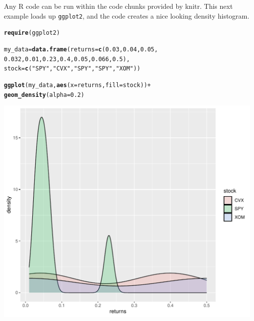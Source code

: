 \documentclass{article}\usepackage[]{graphicx}\usepackage[]{xcolor}
\makeatletter
\def\maxwidth{ %
  \ifdim\Gin@nat@width>\linewidth
    \linewidth
  \else
    \Gin@nat@width
  \fi
}
\newcommand{\hlnum}[1]{\textcolor[rgb]{0.686,0.059,0.569}{#1}}%
\newcommand{\hlstr}[1]{\textcolor[rgb]{0.192,0.494,0.8}{#1}}%
\newcommand{\hlopt}[1]{\textcolor[rgb]{0,0,0}{#1}}%
\newcommand{\hlstd}[1]{\textcolor[rgb]{0.345,0.345,0.345}{#1}}%
\newcommand{\hlkwb}[1]{\textcolor[rgb]{0.69,0.353,0.396}{#1}}%
\newcommand{\hlkwc}[1]{\textcolor[rgb]{0.333,0.667,0.333}{#1}}%
\newcommand{\hlkwd}[1]{\textcolor[rgb]{0.737,0.353,0.396}{\textbf{#1}}}%
\newenvironment{kframe}{%
 \def\at@end@of@kframe{}%
 \ifinner\ifhmode%
  \def\at@end@of@kframe{\end{minipage}}%
  \begin{minipage}{\columnwidth}%
 \fi\fi%
 \def\FrameCommand##1{\hskip\@totalleftmargin \hskip-\fboxsep
 \colorbox{shadecolor}{##1}\hskip-\fboxsep
     \hskip-\linewidth \hskip-\@totalleftmargin \hskip\columnwidth}%
 \MakeFramed {\advance\hsize-\width
   \@totalleftmargin\z@ \linewidth\hsize
   \@setminipage}}%
 {\par\unskip\endMakeFramed%
 \at@end@of@kframe}
\newenvironment{knitrout}{}{} %
\makeatother
\begin{document}
Any R code can be run within the code chunks
provided by knitr. This next example loads up
\texttt{ggplot2}, and the code creates a nice looking
density histogram.

\begin{knitrout}
\color{fgcolor}\begin{kframe}
\begin{alltt}
\hlkwd{require}\hlstd{(ggplot2)}
\end{alltt}


{\ttfamily\noindent\itshape\color{messagecolor}{\#\# Loading required package: ggplot2}}\begin{alltt}
\hlstd{my_data} \hlkwb{=} \hlkwd{data.frame}\hlstd{(}\hlkwc{returns} \hlstd{=} \hlkwd{c}\hlstd{(}\hlnum{0.03}\hlstd{,} \hlnum{0.04}\hlstd{,} \hlnum{0.05}\hlstd{,}
\hlnum{0.032}\hlstd{,} \hlnum{0.01}\hlstd{,} \hlnum{0.23}\hlstd{,} \hlnum{0.4}\hlstd{,} \hlnum{0.05}\hlstd{,} \hlnum{0.066}\hlstd{,} \hlnum{0.5}\hlstd{),}
\hlkwc{stock} \hlstd{=} \hlkwd{c}\hlstd{(}\hlstr{"SPY"}\hlstd{,} \hlstr{"CVX"}\hlstd{,} \hlstr{"SPY"}\hlstd{,} \hlstr{"SPY"}\hlstd{,} \hlstr{"XOM"}\hlstd{))}

\hlkwd{ggplot}\hlstd{(my_data,} \hlkwd{aes}\hlstd{(}\hlkwc{x} \hlstd{= returns,} \hlkwc{fill} \hlstd{= stock))} \hlopt{+}
\hlkwd{geom_density}\hlstd{(}\hlkwc{alpha} \hlstd{=} \hlnum{0.2}\hlstd{)}
\end{alltt}
\end{kframe}
\includegraphics[width=\maxwidth]{figure/foo3-1} 
\end{knitrout}
\end{document}
